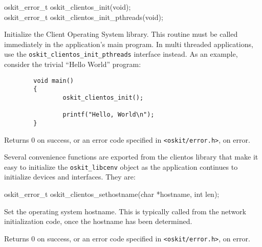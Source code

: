 \begin{apisyn}

	\funcproto oskit_error_t oskit_clientos_init(void); \\
	\funcproto oskit_error_t oskit_clientos_init_pthreads(void);
\end{apisyn}
\begin{apidesc}
	Initialize the Client Operating System library. This routine must
	be called immediately in the application's main program. In multi
	threaded applications, use the
	\texttt{oskit_clientos_init_pthreads} interface instead. As an
	example, consider the trivial ``Hello World'' program:
	\begin{codefrag}
	\begin{verbatim}
        void main()
        {
                oskit_clientos_init();

                printf("Hello, World\n");
        }
        \end{verbatim}
	\end{codefrag}

\end{apidesc}
\begin{apiret}
	Returns 0 on success, or an error code specified in
	{\tt <oskit/error.h>}, on error.
\end{apiret}

Several convenience functions are exported from the clientos library that
make it easy to initialize the \texttt{oskit_libcenv} object as the
application continues to initialize devices and interfaces. They are:

\begin{apisyn}

	\funcproto oskit_error_t
		   oskit_clientos_sethostname(char *hostname, int len);
\end{apisyn}
\begin{apidesc}
	Set the operating system hostname. This is typically called from
	the network initialization code, once the hostname has been
	determined. 
\end{apidesc}
\begin{apiret}
	Returns 0 on success, or an error code specified in
	{\tt <oskit/error.h>}, on error.
\end{apiret}

